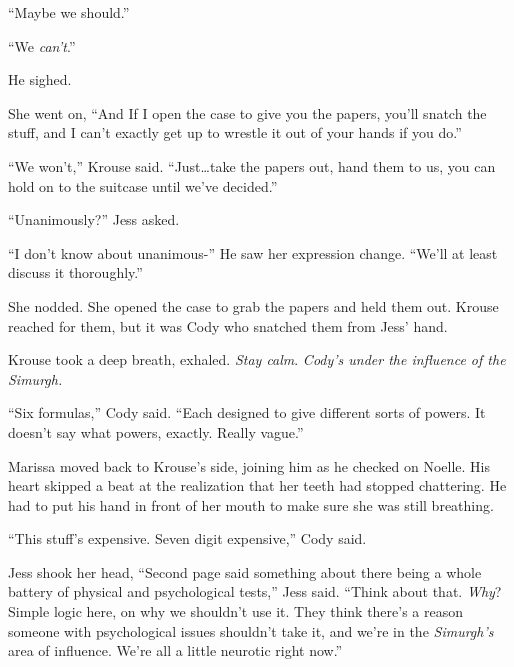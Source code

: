``Maybe we should.''



``We \emph{can't}.''



He sighed.



She went on, ``And If I open the case to give you the papers, you'll snatch the stuff, and I can't exactly get up to wrestle  it out of your hands if you do.''



``We won't,'' Krouse said.  ``Just\ldots take the papers out, hand them to us, you can hold on to the suitcase until we've decided.''



``Unanimously?'' Jess asked.



``I don't know about unanimous-'' He saw her expression change.  ``We'll at least discuss it thoroughly.''



She nodded.  She opened the case to grab the papers and held them out.  Krouse reached for them, but it was Cody who snatched them from Jess' hand.



Krouse took a deep breath, exhaled.  \emph{Stay calm}.  \emph{Cody's under the influence of the Simurgh.}



``Six formulas,'' Cody said.  ``Each designed to give different sorts of powers.  It doesn't say what powers, exactly.  Really vague.''



Marissa moved back to Krouse's side, joining him as he checked on Noelle.  His heart skipped a beat at the realization that her teeth had stopped chattering.  He had to put his hand in front of her mouth to make sure she was still breathing.



``This stuff's expensive.  Seven digit expensive,'' Cody said.



Jess shook her head, ``Second page said something about there being a whole battery of physical and psychological tests,'' Jess said.  ``Think about that.  \emph{Why}?  Simple logic here, on why we shouldn't use it.  They think there's a reason someone with psychological issues shouldn't take it, and we're in the \emph{Simurgh's} area of influence.  We're all a little neurotic right now.''



